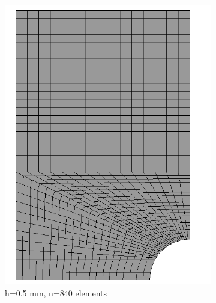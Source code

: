 \documentclass[12pt]{report}
\begin{document}
\begin{figure}[htbp!]
\begin{subfigure}{0.27\textwidth}
         \includegraphics[width=1.27\textwidth]{25.0.5mm2.png}
         \caption{h=0.5 mm, n=840 elements}
         \label{fig:0.5mm}
     \end{subfigure}
     \hfill
     \begin{subfigure}{0.27\textwidth}

\end{subfigure}
\end{figure}
\end{document}
